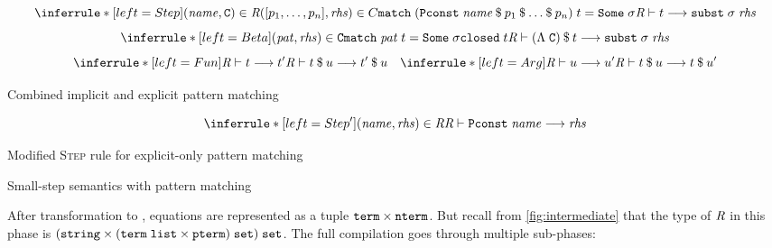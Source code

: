 \begin{code}[t]
  \begin{subcode}{\linewidth}
    \[
      \inferrule*[left=Step]{(\mathit{name}, \C) \in \R \\ ([p_1, \ldots, p_n], \mathit{rhs}) \in C \\ \holconst{match}\;(\holconst{Pconst}\;\mathit{name}\mathbin\$p_1\mathbin\$\ldots\mathbin\$p_n)\;t = \holconst{Some}\;\sigma}{\rewrite{\R}{t}{\holconst{subst}\;\sigma\;\mathit{rhs}}}
    \]
    \[
      \inferrule*[left=Beta]{(\mathit{pat}, \mathit{rhs}) \in \C \\ \holconst{match}\;\mathit{pat}\;t = \holconst{Some}\;\sigma \\ \holconst{closed}\;t}{\rewrite{\R}{\app{(\Lambda\; \C)}{t}}{\holconst{subst}\;\sigma\;\mathit{rhs}}}
    \]
    \[
      \inferrule*[left=Fun]{\rewrite{\R}{t}{t'}}{\rewrite{\R}{\app t u}{\app{t'}{u}}}
      \quad
      \inferrule*[left=Arg]{\rewrite{\R}{u}{u'}}{\rewrite{\R}{\app t u}{\app{t}{u'}}}
    \]
    \caption{Combined implicit and explicit pattern matching}
  \end{subcode}
  \vspace{1em}

  \begin{subcode}{\linewidth}
    \[
      \inferrule*[left=Step']{(\mathit{name}, \mathit{rhs}) \in \R}{\rewrite{\R}{\holconst{Pconst}\;\mathit{name}}{\mathit{rhs}}}
    \]
    \caption{Modified \textsc{Step} rule for explicit-only pattern matching}
    \label{code:intermediate:elim:explicit}
  \end{subcode}

  \caption{Small-step semantics with pattern matching}
  \label{code:intermediate:elim}
\end{code}

After transformation to , equations are represented as a tuple $\texttt{\textup{term}} \times \texttt{\textup{nterm}}$.
But recall from \cref{fig:intermediate} that the type of $\textit{R}$ in this phase is $(\texttt{\textup{string}} \times (\texttt{\textup{term}}\;\texttt{\textup{list}} \times \texttt{\textup{pterm}})\;\texttt{\textup{set}})\;\texttt{\textup{set}}$.
The full compilation goes through multiple sub-phases:

